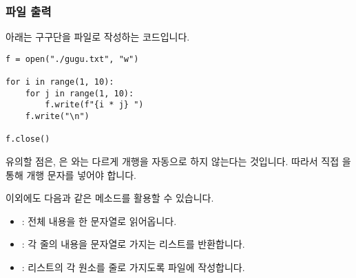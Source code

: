 \documentclass[../main.tex]{subfiles}
\begin{document}
\subsubsection{파일 출력}
아래는 구구단을 파일로 작성하는 코드입니다.
\begin{verbatim}
f = open("./gugu.txt", "w")

for i in range(1, 10):
    for j in range(1, 10):
        f.write(f"{i * j} ")
    f.write("\n")

f.close()
\end{verbatim}
유의할 점은, 은 와는 다르게 개행을 자동으로 하지 않는다는 것입니다.
따라서 직접 을 통해 개행 문자를 넣어야 합니다.

이외에도 다음과 같은 메소드를 활용할 수 있습니다.
\begin{itemize}
    \item {}: 전체 내용을 한 문자열로 읽어옵니다.
    \item {}: 각 줄의 내용을 문자열로 가지는 리스트를 반환합니다.
    \item {}: 리스트의 각 원소를 줄로 가지도록 파일에 작성합니다.
\end{itemize}
\end{document}
